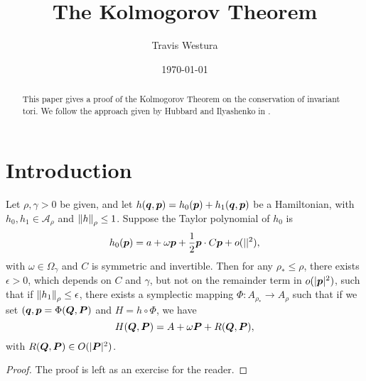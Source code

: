 \documentclass[twoside,letterpaper,10pt]{article}
\title{The Kolmogorov Theorem}
\author{Travis Westura}
\date{\today}
\begin{document}
\maketitle

\section{Introduction}
\label{sec:introduction}

\begin{abstract}
  This paper gives a proof of the Kolmogorov Theorem on the conservation of
  invariant tori.
  We follow the approach given by Hubbard and Ilyashenko in .
\end{abstract}

\begin{thm}
  \label{thm:KAM}
  Let $\rho, \gamma > 0$ be given, and let $h(\bm{q}, \bm{p}) = h_0(\bm{p}) +
  h_1(\bm{q}, \bm{p})$ be a Hamiltonian, with $h_0, h_1 \in \mathcal{A}_{\rho}$
  and $\norm{h}_{\rho} \leq 1$.
  Suppose the Taylor polynomial of $h_0$ is
  \begin{equation*}
    h_0(\bm{p}) = a + \omega\bm{p} + \frac{1}{2} \bm{p} \cdot C \bm{p} +
    o(|\bm{}|^2),
  \end{equation*}
  with $\omega \in \Omega_{\gamma}$ and $C$ is symmetric and invertible.
  Then for any $\rho_* \leq \rho$, there exists $\epsilon > 0$, which depends on
  $C$ and $\gamma$, but not on the remainder term in $o(|\bm{p}|^2)$, such that
  if $\norm{h_1}_{\rho} \leq \epsilon$, there exists a symplectic mapping $\Phi
  : A_{\rho_*} \to A_{\rho}$ such that if we set $(\bm{q}, \bm{p} = \Phi(\bm{Q},
  \bm{P})$ and $H = h \circ \Phi$, we have
  \begin{equation*}
    H(\bm{Q}, \bm{P}) = A + \omega \bm{P} + R(\bm{Q}, \bm{P}),
  \end{equation*}
  with $R(\bm{Q}, \bm{P}) \in O(|\bm{P}|^2)$.
\end{thm}

\begin{proof}
  The proof is left as an exercise for the reader.
\end{proof}
\end{document}
